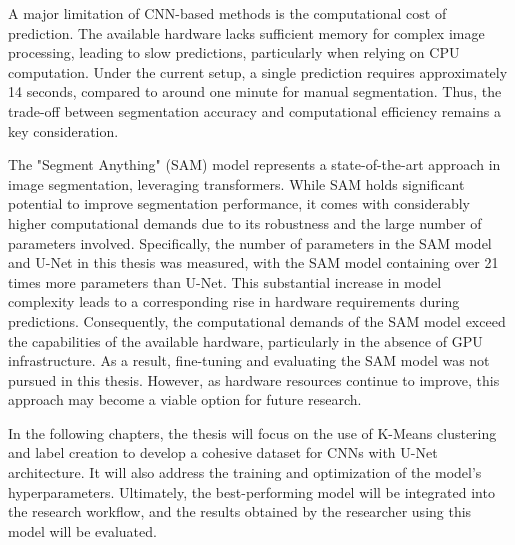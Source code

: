 A major limitation of CNN-based methods is the computational cost of prediction. The available hardware lacks sufficient memory for complex image processing, leading to slow predictions, particularly when relying on CPU computation. Under the current setup, a single prediction requires approximately 14 seconds, compared to around one minute for manual segmentation. Thus, the trade-off between segmentation accuracy and computational efficiency remains a key consideration.

The "Segment Anything" (SAM) model \cite{kirillov2023segany} represents a state-of-the-art approach in image segmentation, leveraging transformers. While SAM holds significant potential to improve segmentation performance, it comes with considerably higher computational demands due to its robustness and the large number of parameters involved. Specifically, the number of parameters in the SAM model and U-Net in this thesis was measured, with the SAM model containing over 21 times more parameters than U-Net. This substantial increase in model complexity leads to a corresponding rise in hardware requirements during predictions. Consequently, the computational demands of the SAM model exceed the capabilities of the available hardware, particularly in the absence of GPU infrastructure. As a result, fine-tuning and evaluating the SAM model was not pursued in this thesis. However, as hardware resources continue to improve, this approach may become a viable option for future research.

In the following chapters, the thesis will focus on the use of K-Means clustering and label creation to develop a cohesive dataset for CNNs with U-Net architecture. It will also address the training and optimization of the model's hyperparameters. Ultimately, the best-performing model will be integrated into the research workflow, and the results obtained by the researcher using this model will be evaluated.




